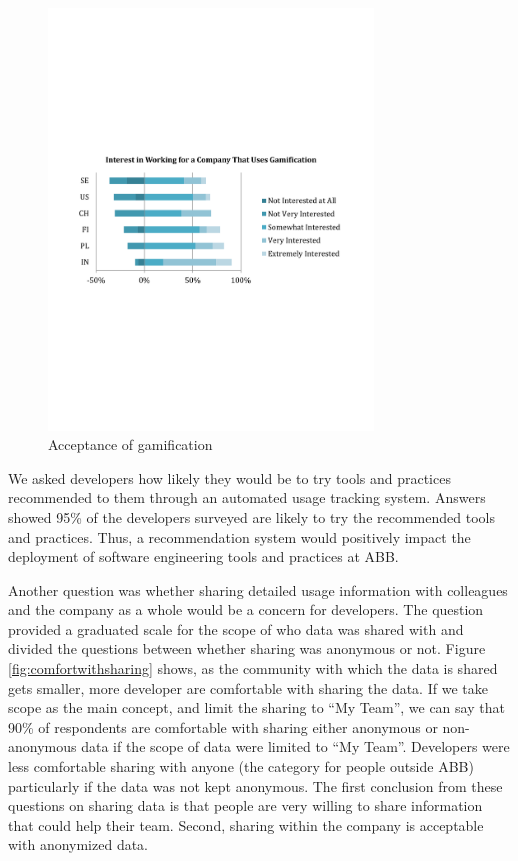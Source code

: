 \documentclass{sig-alternate}
\begin{document}
\begin{figure}
	\includegraphics[width=3.4in]{gamificationquestion.pdf}
	\caption{Acceptance of gamification}
	\label{fig:gamification}
\end{figure}

We asked developers how likely they would be to try tools and practices recommended to them through an automated usage tracking system.  Answers showed 95\% of the developers surveyed are likely to try the recommended tools and practices.  Thus, a recommendation system would positively impact the deployment of software engineering tools and practices at ABB.

Another question was whether sharing detailed usage information with colleagues and the company as a whole would be a concern for developers.  The question provided a graduated scale for the scope of who data was shared with and divided the questions between whether sharing was anonymous or not. Figure \ref{fig:comfortwithsharing}  shows, as the community with which the data is shared gets smaller, more developer are comfortable with sharing the data.  If we take scope as the main concept, and limit the sharing to ``My Team'', we can say that 90\% of respondents are comfortable with sharing either anonymous or non-anonymous data if the scope of data were limited to ``My Team''.  Developers were less comfortable sharing with anyone (the category for people outside ABB) particularly if the data was not kept anonymous.  
The first conclusion from these questions on sharing data is that people are very willing to share information that could help their team. Second, sharing within the company is acceptable with anonymized data.
\end{document}
